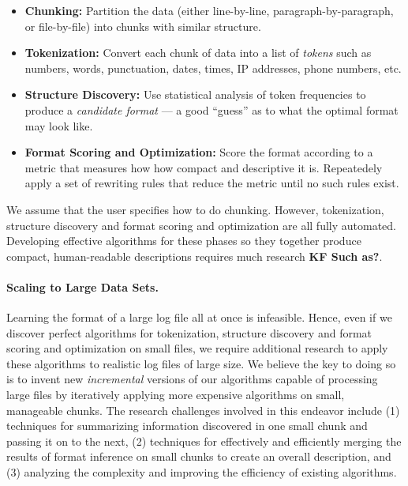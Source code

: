 \begin{itemize}
\item {\bf Chunking:}  Partition the data (either line-by-line,
  paragraph-by-paragraph, or file-by-file) into chunks with similar structure.
\item {\bf Tokenization:}  Convert each chunk of data into a list of 
{\em tokens} such as numbers, words, punctuation, dates, times, IP addresses, phone numbers, etc.
\item {\bf Structure Discovery:}  Use statistical analysis of token
  frequencies to produce a {\em candidate format} --- a good ``guess''
  as to what the optimal format may look like. 
\item {\bf Format Scoring and Optimization:}  Score the format
  according to a metric that measures how how compact and descriptive
  it is.  Repeatedely apply a set of rewriting rules that reduce the
  metric until no such rules exist.
\end{itemize}

We assume that the user specifies how to do chunking.  However,
tokenization, structure discovery and format scoring and optimization are all
fully automated.  Developing effective algorithms for these phases so they together 
produce compact, human-readable descriptions requires much research
\textbf{KF Such as?}. 

\paragraph*{Scaling to Large Data Sets.}  Learning the format of a large
log file all at once is infeasible.  Hence, even if we discover perfect
algorithms for tokenization, structure discovery and format scoring and optimization
on small files, we require additional research to apply these algorithms
to realistic log files of large size.  We believe the key to doing so is to invent
new {\em incremental} versions of our algorithms capable of 
processing large files by iteratively applying more expensive
algorithms on small, manageable chunks.  The research challenges
involved in this endeavor include (1) techniques for summarizing
information discovered in one small chunk and passing it on to the
next, (2) techniques for effectively and
efficiently merging the results of format inference on small chunks
to create an overall description, and (3) analyzing the complexity and
improving the efficiency of existing algorithms.


